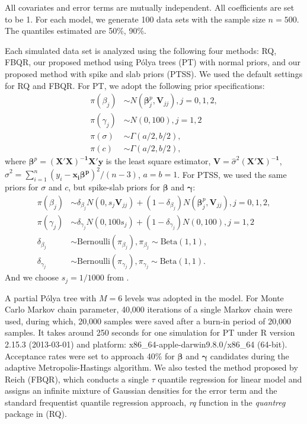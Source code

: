 \documentclass[12pt]{article}
\newcommand{\polya}{P\'{o}lya}
\begin{document}
All covariates and error terms are mutually independent. All
coefficients are set to be 1. For each model, we generate 100 data
sets with the sample size $n=500$. The quantiles estimated are 50\%,
90\%.

Each simulated data set is analyzed using the following four methods:
RQ, FBQR, our proposed method using \polya{} trees (PT) with normal
priors, and our proposed method with spike and slab priors (PTSS).  We
used the default settings for RQ and FBQR.  For PT, we adopt the
following prior specifications:
\begin{align*}
  \pi(\beta_j) & \sim N(\bm \beta_j^p, \bm V_{jj}) , j = 0, 1, 2,\\
  \pi(\gamma_j) & \sim N(0, 100), j = 1, 2\\
  \pi(\sigma) & \sim \Gamma (a/2, b/2), \\
  \pi(c) & \sim \Gamma(a/2, b/2),
\end{align*}
where $\bm \beta^p = \bm{(X'X)^{-1}X'y}$ is the least square
estimator, $\bm V = \hat{\sigma}^2\bm{(X'X)^{-1}}$, $\hat{\sigma}^2 =
\sum_{i = 1}^n (y_i - \bm {x_i \beta^p})^2/ (n - 3)$, $a = b = 1$.
For PTSS, we used the same priors for $\sigma$ and $c$, but spike-slab
priors for $\bm \beta$ and $\bm \gamma$:
\begin{align*}
  \pi(\beta_j) & \sim \delta_{\beta_j}N(0, s_j\bm V_{jj}) +  (1 - \delta_{\beta_j})N(\bm \beta_j^p, \bm V_{jj}) , j = 0, 1, 2,\\
  \pi(\gamma_j) & \sim \delta_{\gamma_j}N(0, 100s_j) + (1 - \delta_{\gamma_j}) N(0, 100), j = 1, 2\\
  \delta_{\beta_j} & \sim \mbox{Bernoulli}(\pi_{\beta_j}) , \pi_{\beta_j} \sim \mbox{Beta}(1, 1),\\
  \delta_{\gamma_j} & \sim \mbox{Bernoulli}(\pi_{\gamma_j}),
  \pi_{\gamma_j} \sim \mbox{Beta}(1, 1).
\end{align*}
And we choose $s_j = 1/1000$ from \cite{george1993}.

A partial \polya{} tree with $M=6$ levels was adopted in the
model. For Monte Carlo Markov chain parameter, 40,000 iterations of a
single Markov chain were used, during which, 20,000 samples were saved
after a burn-in period of 20,000 samples.  It takes around  250 seconds
for one simulation for PT under R version 2.15.3 (2013-03-01) and
platform: x86\_64-apple-darwin9.8.0/x86\_64 (64-bit). Acceptance rates
were set to approach 40\% for $\bm{\beta}$ and $\bm{\gamma}$
candidates during the adaptive Metropolis-Hastings algorithm.  We also
tested the method proposed by Reich (FBQR), which conducts a single
$\tau$ quantile regression for linear model and assigns an infinite
mixture of Gaussian densities for the error term and the standard
frequentist quantile regression approach, \textit{rq} function in the
\textit{quantreg} package \citep{quantreg} in \cite{R} (RQ).
\end{document}
